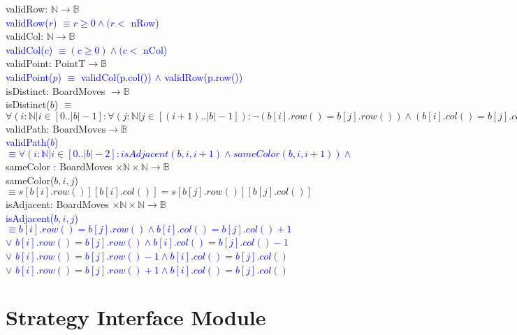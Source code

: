 \documentclass[12pt]{article}
\begin{document}
\noindent validRow: $\mathbb{N} \rightarrow \mathbb{B}$\\
\noindent \textcolor{blue}{validRow($r$) $\equiv r \geq 0 \land (r < $ nRow)} \\

\noindent validCol: $\mathbb{N} \rightarrow \mathbb{B}$\\
\noindent \textcolor{blue}{validCol($c$) $\equiv (c \geq 0) \land (c < $ nCol)} \\


\noindent validPoint: $\mbox{PointT} \rightarrow \mathbb{B}$\\
\noindent \textcolor{blue}{validPoint($p$) $\equiv$ validCol(p.col()) $\land$ validRow(p.row())}\\

\noindent isDistinct: BoardMoves $\rightarrow \mathbb{B}$\\
\noindent isDistinct($b$) $\equiv$ $\forall(i : \mathbb{N}| i \in [0..|b|-1] : \forall (j : \mathbb{N} | j \in [(i+1)..|b|-1]) : \lnot (b[i].row() = b[j].row()) \land (b[i].col() = b[j].col()) )$  \\


\noindent validPath: $\mbox{BoardMoves} \rightarrow \mathbb{B}$\\
\noindent \textcolor{blue}{validPath($b$) $\equiv \forall(i : \mathbb{N} | i \in [0..|b|-2] : isAdjacent(b,i,i+1) \land sameColor(b,i,i+1)  ) \land $}\\
 
\noindent sameColor : BoardMoves $\times \mathbb{N} \times \mathbb{N} \rightarrow \mathbb{B} $\\
\noindent sameColor($b,i,j$) $\equiv s[b[i].row()][b[i].col()] = s[b[j].row()][b[j].col()]$\\

\noindent isAdjacent: BoardMoves $\times \mathbb{N} \times \mathbb{N} \rightarrow \mathbb{B}$\\
\noindent \textcolor{blue}{isAdjacent($b,i,j$) $\equiv b[i].row() = b[j].row() \land b[i].col() = b[j].col() + 1$\\
$\lor$  $b[i].row() = b[j].row() \land b[i].col() = b[j].col() - 1$\\
$\lor$  $b[i].row() = b[j].row() - 1 \land b[i].col() = b[j].col()$\\
$\lor$  $b[i].row() = b[j].row() + 1 \land b[i].col() = b[j].col()$ }\\


\newpage

\section* {Strategy Interface Module}
\end{document}
